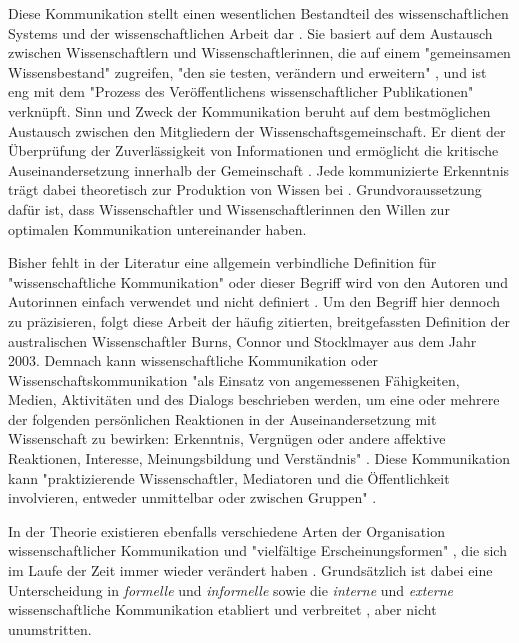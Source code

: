 Diese Kommunikation stellt einen wesentlichen Bestandteil des wissenschaftlichen Systems und der wissenschaftlichen Arbeit dar \cite{Garvey_2014} \cite[:63]{Luhmann_1998}. Sie basiert auf dem Austausch zwischen Wissenschaftlern und Wissenschaftlerinnen, die auf einem "gemeinsamen Wissensbestand" zugreifen, "den sie testen, verändern und erweitern" \cite[:438]{Glaeser_2007}, und ist eng mit dem "Prozess des Veröffentlichens wissenschaftlicher Publikationen" \cite{Weller_2011} verknüpft. Sinn und Zweck der Kommunikation beruht auf dem bestmöglichen Austausch zwischen den Mitgliedern der Wissenschaftsgemeinschaft. Er dient der Überprüfung der Zuverlässigkeit von Informationen und ermöglicht die kritische Auseinandersetzung innerhalb der Gemeinschaft \cite{Fox_1983}. Jede kommunizierte Erkenntnis trägt dabei theoretisch zur Produktion von Wissen bei \cite{Kaden_2009}. Grundvoraussetzung dafür ist, dass Wissenschaftler und Wissenschaftlerinnen den Willen zur optimalen Kommunikation untereinander haben.

Bisher fehlt in der Literatur eine allgemein verbindliche Definition für "wissenschaftliche Kommunikation" oder dieser Begriff wird von den Autoren und Autorinnen einfach verwendet und nicht definiert \cite[:2]{Seidenfaden_2005}. Um den Begriff hier dennoch zu präzisieren, folgt diese Arbeit der häufig zitierten, breitgefassten Definition der australischen Wissenschaftler Burns, Connor und Stocklmayer aus dem Jahr 2003. Demnach kann wissenschaftliche Kommunikation oder Wissenschaftskommunikation "als Einsatz von angemessenen Fähigkeiten, Medien, Aktivitäten und des Dialogs beschrieben werden, um eine oder mehrere der folgenden persönlichen Reaktionen in der Auseinandersetzung mit Wissenschaft zu bewirken: Erkenntnis, Vergnügen oder andere affektive Reaktionen, Interesse, Meinungsbildung und Verständnis" \cite[:191]{Burns_2003}. Diese Kommunikation kann "praktizierende Wissenschaftler, Mediatoren und die Öffentlichkeit involvieren, entweder unmittelbar oder zwischen Gruppen" \cite[:191]{Burns_2003}.

In der Theorie existieren ebenfalls verschiedene Arten der Organisation wissenschaftlicher Kommunikation und "vielfältige Erscheinungsformen" \cite[:9]{Graefen_2007}, die sich im Laufe der Zeit immer wieder verändert haben \cite{Konneker_2013} \cite{Hagner_2015}. Grundsätzlich ist dabei eine Unterscheidung in \textit{formelle} und \textit{informelle} sowie die \textit{interne} und \textit{externe} wissenschaftliche Kommunikation etabliert und verbreitet \cite{Seidenfaden_2005}, aber nicht unumstritten.

